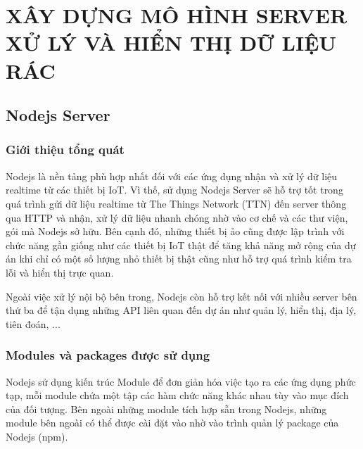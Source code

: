 


\chapter{XÂY DỰNG MÔ HÌNH SERVER XỬ LÝ VÀ HIỂN THỊ DỮ LIỆU RÁC}


\section{Nodejs Server}
\subsection{Giới thiệu tổng quát}
Nodejs là nền tảng phù hợp nhất đối với các ứng dụng nhận và xử lý dữ liệu realtime từ các thiết bị IoT. Vì thế, sử dụng Nodejs Server sẽ hỗ trợ tốt trong quá trình gửi dữ liệu realtime từ The Things Network (TTN) đến server thông qua HTTP và nhận, xử lý dữ liệu nhanh chóng nhờ vào cơ chế và các thư viện, gói mà Nodejs sở hữu. Bên cạnh đó, những thiết bị ảo cũng được lập trình với chức năng gần giống như các thiết bị IoT thật để tăng khả năng mở rộng của dự án khi chỉ có một số lượng nhỏ thiết bị thật cũng như hỗ trợ quá trình kiểm tra lỗi và hiển thị trực quan.

Ngoài việc xử lý nội bộ bên trong, Nodejs còn hỗ trợ kết nối với nhiều server bên thứ ba để tận dụng những API liên quan đến dự án như quản lý, hiển thị, địa lý, tiên đoán, ...

\subsection{Modules và packages được sử dụng}
Nodejs sử dụng kiến trúc Module để đơn giản hóa việc tạo ra các ứng dụng phức tạp, mỗi module chứa một tập các hàm chức năng khác nhau tùy vào mục đích của đối tượng. Bên ngoài những module tích hợp sẵn trong Nodejs, những module bên ngoài có thể được cài đặt vào nhờ vào trình quản lý package của Nodejs (npm). 

